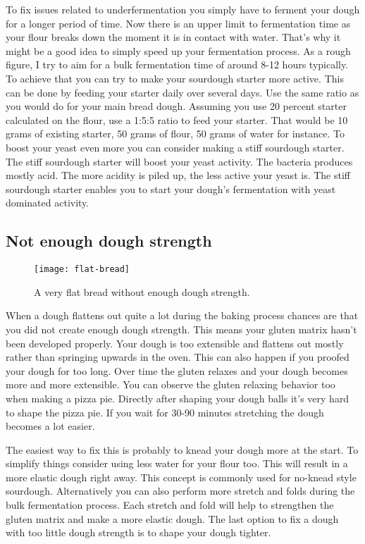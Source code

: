 To fix issues related to underfermentation you simply have to ferment your dough
for a longer period of time. Now there is an upper limit to fermentation time
as your flour breaks down the moment it is in contact with water. That's why it
might be a good idea to simply speed up your fermentation process. As a rough
figure, I try to aim for a bulk fermentation time of around 8-12 hours typically.
To achieve that you can try to make your sourdough starter more active.  This can be done
by feeding your starter daily over several days. Use the same ratio as you would
do for your main bread dough. Assuming you use 20 percent starter calculated on the flour,
use a 1:5:5 ratio to feed your starter. That would be 10 grams of existing starter,
50 grams of flour, 50 grams of water for instance. To boost your yeast even more you can
consider making a stiff sourdough starter. The stiff sourdough starter will
boost your yeast activity. The bacteria produces mostly acid. The more acidity
is piled up, the less active your yeast is. The stiff sourdough starter
enables you to start your dough's fermentation with yeast dominated activity.


\subsection{Not enough dough strength}

\begin{figure}
  \texttt{[image: flat-bread]}
  \caption{A very flat bread without enough dough strength.}
  \label{flat-bread}
\end{figure}

When a dough flattens out quite a lot during the baking process chances are
that you did not create enough dough strength. This means your gluten matrix
hasn't been developed properly. Your dough is too extensible and flattens out
mostly rather than springing upwards in the oven. This can also happen if you
proofed your dough for too long. Over time the gluten relaxes and your dough
becomes more and more extensible. You can observe the gluten relaxing behavior
too when making a pizza pie. Directly after shaping your dough balls it's very hard to shape
the pizza pie. If you wait for 30-90 minutes stretching the dough becomes a lot easier.

The easiest way to fix this is probably to knead your dough more at the start. To simplify
things consider using less water for your flour too. This will result in a more elastic dough
right away. This concept is commonly used for no-knead style sourdough.  Alternatively you
can also perform more stretch and folds during the bulk fermentation process. Each
stretch and fold will help to strengthen the gluten matrix and make a more elastic dough.
The last option to fix a dough with too little dough strength is to shape your dough tighter.


